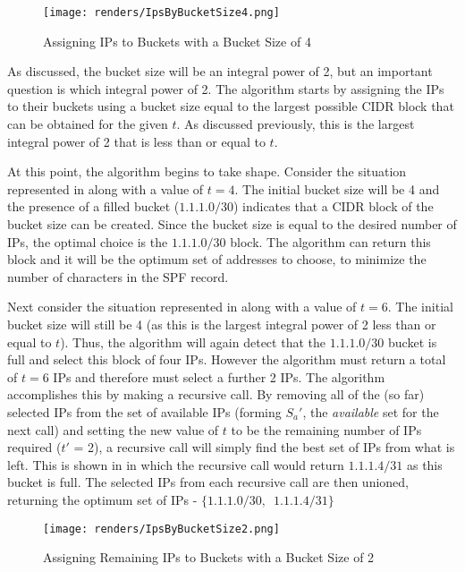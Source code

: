 \begin{figure}[H]
      \centering
      \texttt{[image: renders/IpsByBucketSize4.png]}
      \caption{Assigning IPs to Buckets with a Bucket Size of 4}
      \label{fig:exampleIpsByBucket4}
\end{figure}

As discussed, the bucket size will be an integral power of 2, but an important question is which integral power of 2. The algorithm starts by assigning the IPs to their buckets using a bucket size equal to the largest possible CIDR block that can be obtained for the given $t$. As discussed previously, this is the largest integral power of 2 that is less than or equal to $t$.

At this point, the algorithm begins to take shape. Consider the situation represented in  along with a value of $t = 4$. The initial bucket size will be 4 and the presence of a filled bucket ($1.1.1.0/30$) indicates that a CIDR block of the bucket size can be created. Since the bucket size is equal to the desired number of IPs, the optimal choice is the $1.1.1.0/30$ block. The algorithm can return this block and it will be the optimum set of addresses to choose, to minimize the number of characters in the SPF record.

Next consider the situation represented in  along with a value of $t = 6$. The initial bucket size will still be 4 (as this is the largest integral power of 2 less than or equal to $t$). Thus, the algorithm will again detect that the $1.1.1.0/30$ bucket is full and select this block of four IPs. However the algorithm must return a total of $t = 6$ IPs and therefore must select a further 2 IPs. The algorithm accomplishes this by making a recursive call. By removing all of the (so far) selected IPs from the set of available IPs (forming $S_a'$, the \textit{available} set for the next call) and setting the new value of $t$ to be the remaining number of IPs required ($t'$ = 2), a recursive call will simply find the best set of IPs from what is left. This is shown in  in which the recursive call would return $1.1.1.4/31$ as this bucket is full. The selected IPs from each recursive call are then unioned, returning the optimum set of IPs - $\{1.1.1.0/30,\enspace1.1.1.4/31\}$

\begin{figure}[H]
      \centering
      \texttt{[image: renders/IpsByBucketSize2.png]}
      \caption{Assigning Remaining IPs to Buckets with a Bucket Size of 2}
      \label{fig:exampleIpsByBucket2}
\end{figure}

